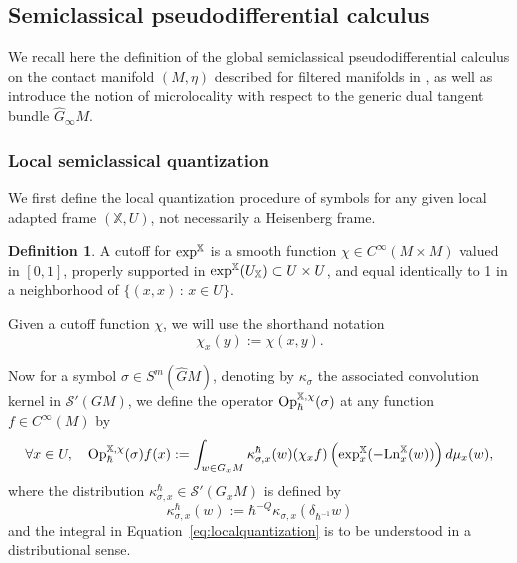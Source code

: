\documentclass[12pt,a4paper]{amsart}
\theoremstyle{plain}
\theoremstyle{definition}
\newtheorem{definition}[theorem]{Definition}
\theoremstyle{remark}
\numberwithin{equation}{section}
\theoremstyle{definition}
\def \Op{{\rm Op}}
\def \Ln{{\rm Ln}}
\def \exp{{\rm exp}}
\def \cS{\mathcal{S}}
\def \bX{\mathbb{X}}
\def \Ghat{\widehat{G}}
\numberwithin{equation}{section}
\begin{document}
\subsection{Semiclassical pseudodifferential calculus} 
\label{subsubsect:semiquantization}

We recall here the definition of the global semiclassical pseudodifferential calculus on the contact manifold $(M,\eta)$ described for filtered manifolds in \cite{BFF25}, as well as introduce the notion of microlocality with respect to the generic dual tangent bundle $\Ghat_\infty M$.

\subsubsection{Local semiclassical quantization}
\label{subsubsect:locsemiquantiz}
We first define the local quantization procedure of symbols for any given local adapted frame $(\bX,U)$, not necessarily a Heisenberg frame.

\begin{definition}
    \label{def:cutoff}
    A cutoff for $\exp^\bX$ is a smooth function $\chi\in C^\infty(M\times M)$ valued in $[0,1]$, properly supported in $\exp^\bX(U_\bX)\subset U\times U$, and equal identically to 1 in a neighborhood of $\{(x,x)\,:\,x\in U\}$.
\end{definition}

Given a cutoff function $\chi$, we will use the shorthand notation
\begin{equation*}
    \chi_x(y) :=\chi(x,y).
\end{equation*}

Now for a symbol $\sigma \in S^m(\Ghat M)$, denoting by $\kappa_{\sigma}$ the associated convolution kernel in $\cS'(GM)$, we define the operator $\Op_{\hbar}^{\bX,\chi}(\sigma)$ at any function $f\in C^\infty(M)$ by 
\begin{equation}
    \label{eq:localquantization}
    \forall x \in U,\quad \Op_{\hbar}^{\bX,\chi}(\sigma)f(x) := \int_{w\in G_x M} \kappa_{\sigma,x}^\hbar(w) (\chi_x f)\left(\exp_{x}^\bX(-\Ln_{x}^\bX(w))\right)d\mu_x(w),
\end{equation}
where the distribution $\kappa_{\sigma,x}^\hbar\in \cS'(G_x M)$ is defined by 
\begin{equation*}
    \kappa_{\sigma,x}^\hbar(w) := \hbar^{-Q} \kappa_{\sigma,x}(\delta_{\hbar^{-1}} w)
\end{equation*}
and the integral in Equation~\eqref{eq:localquantization} is to be understood in a distributional sense. 
\end{document}

